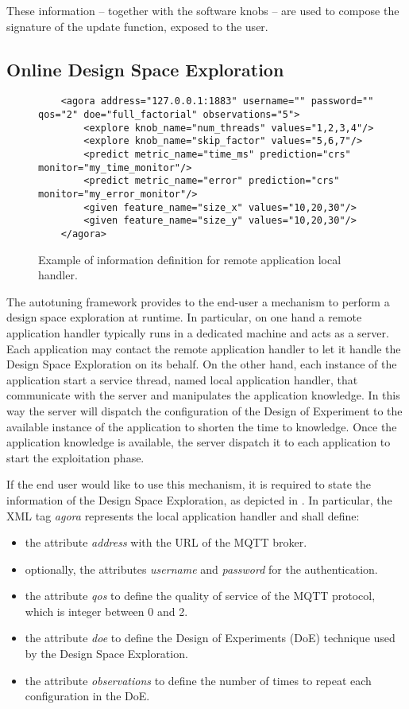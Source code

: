 These information -- together with the software knobs --  are used to compose the signature of the update function, exposed to the user.



\subsection{Online Design Space Exploration}


\begin{figure}
	\lstset{language=XML}
	\begin{lstlisting}
	<agora address="127.0.0.1:1883" username="" password="" qos="2" doe="full_factorial" observations="5">
		<explore knob_name="num_threads" values="1,2,3,4"/>
		<explore knob_name="skip_factor" values="5,6,7"/>
		<predict metric_name="time_ms" prediction="crs" monitor="my_time_monitor"/>
		<predict metric_name="error" prediction="crs" monitor="my_error_monitor"/>
		<given feature_name="size_x" values="10,20,30"/>
		<given feature_name="size_y" values="10,20,30"/>
	</agora>
	\end{lstlisting}
	\caption{Example of information definition for remote application local handler.}
	\label{code:agora_xml}
\end{figure}

The autotuning framework provides to the end-user a mechanism to perform a design space exploration at runtime.
In particular, on one hand a remote application handler typically runs in a dedicated machine and acts as a server.
Each application may contact the remote application handler to let it handle the Design Space Exploration on its behalf.
On the other hand, each instance of the application start a service thread, named local application handler, that communicate with the server and manipulates the application knowledge.
In this way the server will dispatch the configuration of the Design of Experiment to the available instance of the application to shorten the time to knowledge.
Once the application knowledge is available, the server dispatch it to each application to start the exploitation phase.

If the end user would like to use this mechanism, it is required to state the information of the Design Space Exploration, as depicted in .
In particular, the XML tag \textit{agora} represents the local application handler and shall define:
\begin{itemize}
	\item the attribute \textit{address} with the URL of the MQTT broker.
	\item optionally, the attributes \textit{username} and \textit{password} for the authentication.
	\item the attribute \textit{qos} to define the quality of service of the MQTT protocol, which is integer between 0 and 2.
	\item the attribute \textit{doe} to define the Design of Experiments (DoE) technique used by the Design Space Exploration.
	\item the attribute \textit{observations} to define the number of times to repeat each configuration in the DoE.
\end{itemize}


